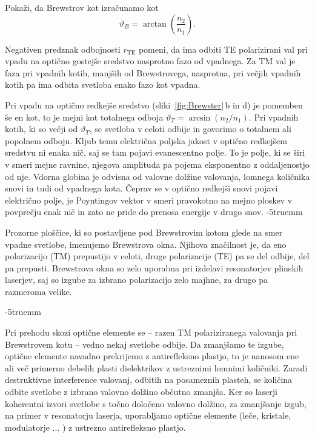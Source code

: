 \begin{definition}
Pokaži, da Brewstrov kot izračunamo kot 
\begin{equation}
\vartheta_{B}=\arctan\left(\frac{n_2}{n_1}\right).
\label{eq:Brew}
\end{equation}
\end{definition}

Negativen predznak odbojnosti $r_{\mathrm{TE}}$ pomeni, da ima odbiti TE 
polarizirani val pri vpadu na optično gostejše sredstvo nasprotno 
fazo od vpadnega. Za TM val je faza pri vpadnih kotih, manjših od Brewstrovega, 
nasprotna, pri večjih vpadnih kotih pa ima odbita svetloba enako fazo kot vpadna. 

Pri vpadu na optično redkejše sredstvo (sliki~\ref{fig:Brewster}\,b in d) je pomemben 
še en kot, to je mejni kot totalnega odboja $\vartheta_T = \arcsin\left(n_2/n_1\right)$. 
Pri vpadnih kotih, ki so večji od $\vartheta_T$, se svetloba v celoti odbije in govorimo
o totalnem ali popolnem odboju. 
Kljub temu električna poljska jakost v optično redkejšem sredstvu
ni enaka nič, saj se tam pojavi evanescentno polje.
To je polje, ki se širi v smeri mejne ravnine, njegova amplituda pa pojema 
eksponentno z oddaljenostjo od nje. Vdorna globina je odvisna od valovne 
dolžine valovanja, lomnega količnika snovi in tudi od vpadnega kota. 
Čeprav se v optično redkejši snovi pojavi električno polje, je Poyntingov
vektor v smeri pravokotno na mejno ploskev v povprečju enak nič in zato ne pride do prenosa energije
v drugo snov.
\vglue-5truemm
\begin{remark}
Prozorne ploščice, ki so postavljene pod Brewstrovim kotom glede na smer vpadne svetlobe, 
imenujemo Brewstrova okna. Njihova značilnost je,
da eno polarizacijo (TM) prepustijo v celoti, druge polarizacije (TE) pa se del odbije, 
del pa prepusti. Brewstrova okna so zelo uporabna pri izdelavi resonatorjev 
plinskih laserjev, saj so izgube za izbrano polarizacijo zelo majhne, 
za drugo pa razmeroma velike.  
\end{remark}
\vglue-5truemm
\begin{remark}
Pri prehodu skozi optične elemente se --
razen TM polariziranega valovanja pri Brewstrovem
kotu -- vedno nekaj
svetlobe odbije. Da zmanjšamo te izgube, optične elemente navadno
prekrijemo z antirefleksno plastjo, to je nanosom ene ali več primerno
debelih plasti dielektrikov z ustreznimi lomnimi količniki.
Zaradi destruktivne interference valovanj, odbitih na posameznih plasteh,
se količina odbite svetlobe z izbrano
valovno dolžino občutno zmanjša. Ker so laserji
koherentni izvori svetlobe s točno določeno valovno dolžino, za zmanjšanje
izgub, na primer v resonatorju laserja, uporabljamo optične
elemente (leče, kristale, modulatorje ... ) z ustrezno
antirefleksno plastjo.
\end{remark}

